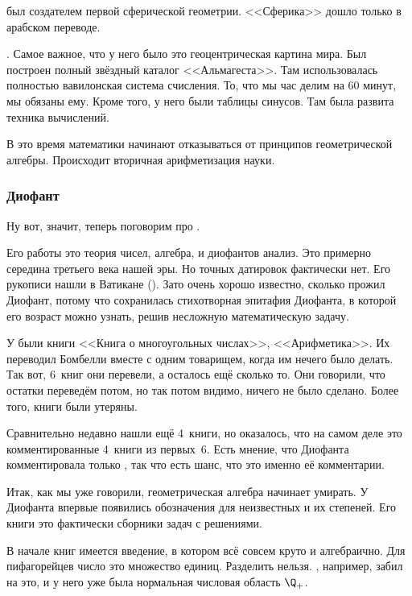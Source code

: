 \documentclass[a4paper,oneside,fleqn,10pt]{article}
\begin{document}
 был создателем первой сферической
геометрии. <<Сферика>> дошло только в арабском переводе.

. Самое важное, что у него было это геоцентрическая
картина мира. Был построен полный звёздный каталог <<Альмагеста>>. Там
использовалась полностью вавилонская система счисления.  То, что мы
час делим на 60 минут, мы обязаны ему. Кроме того, у него были таблицы
синусов.  Там была развита техника вычислений.

В это время математики начинают отказываться от принципов
геометрической алгебры. Происходит вторичная арифметизация науки.

\subsubsection{Диофант}

Ну вот, значит, теперь поговорим про .

Его работы это теория чисел, алгебра, и диофантов анализ. Это примерно
середина третьего века нашей эры.  Но точных датировок фактически
нет. Его рукописи нашли в Ватикане ().  Зато очень хорошо известно, сколько прожил Диофант,
потому что сохранилась стихотворная эпитафия Диофанта, в которой его
возраст можно узнать, решив несложную математическую задачу.

У  были книги <<Книга о многоугольных
числах>>, <<Арифметика>>. Их переводил Бомбелли вместе с одним
товарищем, когда им нечего было делать. Так вот, 6~книг они перевели,
а осталось ещё сколько то. Они говорили, что остатки переведём потом,
но так потом видимо, ничего не было сделано. Более того, книги были
утеряны.

Сравнительно недавно нашли ещё 4~книги, но оказалось, что на самом
деле это комментированные 4~книги из первых~6.  Есть мнение, что
Диофанта комментировала только , так что
есть шанс, что это именно её комментарии.

Итак, как мы уже говорили, геометрическая алгебра начинает умирать. У
Диофанта впервые появились обозначения для неизвестных и их
степеней. Его книги это фактически сборники задач с решениями.

В начале книг имеется введение, в котором всё совсем круто и
алгебраично.  Для пифагорейцев число это множество единиц. Разделить
нельзя. , например, забил на это, и у него уже была
нормальная числовая область $\Q_+$.
\end{document}
